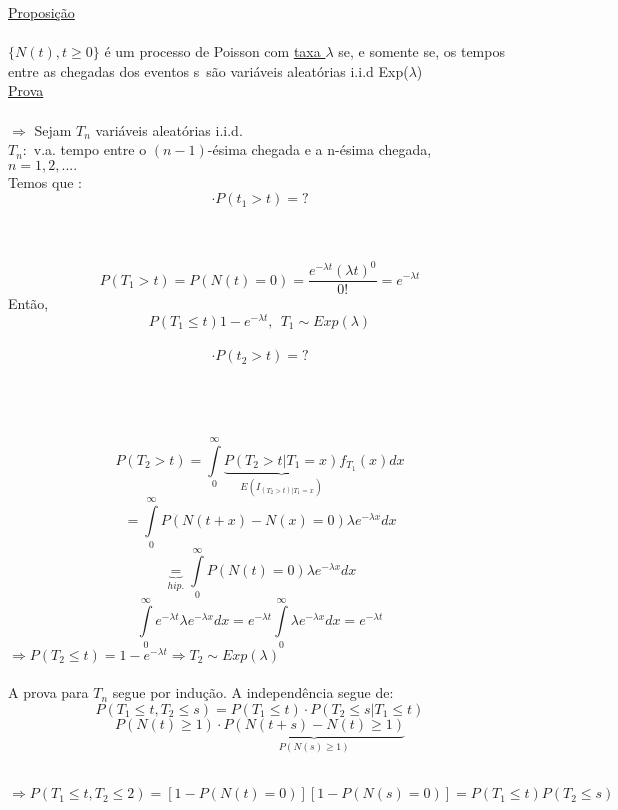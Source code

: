 \documentclass[a4paper,12pt]{article}
\begin{document}
 \underline{Proposição}\\
 \\
 $\{N(t),t\ge0\}$  é um processo de Poisson com \underline{taxa $\lambda$} se, e somente se, os tempos entre as chegadas dos eventos s são variáveis aleatórias i.i.d Exp($\lambda$)
 \\
 \underline{Prova}\\
 \\
 $\Rightarrow$ Sejam $T_n$ variáveis aleatórias i.i.d.\\
 $T_n:$ v.a. tempo entre o $(n-1)$-\'esima chegada e a n-\'esima chegada, \\$n=1,2,....$
 \\
 Temos que :
 $$\cdot P(t_1>t)=?$$
 \\
 \\
 $$P(T_1>t)=P(N(t)=0)=\frac{e^{-\lambda t}(\lambda t)^0}{0!}=e^{-\lambda t}
 $$
 Então,
 $$P(T_1\le t)1-e^{-\lambda t}, \ \ T_1\sim Exp(\lambda)$$
 \\
  $$\cdot P(t_2>t)=?$$
 
  \\
 \\
 \\
 
  $$P(T_2>t)=\int\limits_0^{\infty} \underbrace{P(T_2>t|T_1=x)}_
  {E(I_{(T_2>t)|T_1=x})}f_{T_1}(x)dx$$
 $$=\int\limits_0^{\infty}P(N(t+x)-N(x)=0)\lambda e^{-\lambda x}dx
 $$
 $$\underbrace{=}_{hip.}\int\limits_0^{\infty}P(N(t)=0)\lambda e^{-\lambda x}dx
 $$
 $$\int\limits_0^{\infty}e^{-\lambda t}\lambda e^{-\lambda x}dx=e^{-\lambda t}\int\limits_0^{\infty}\lambda e^{-\lambda x}dx=e^{-\lambda t}
 $$
 $\Rightarrow P(T_2\le t)=1-e^{-\lambda t}\Rightarrow T_2\sim Exp(\lambda)$\\
 \\
 A prova para $T_n$ segue por indução. A independência segue de:
 $$P(T_1\le t, T_2 \le s)=P(T_1\le t)\cdot P(T_2\le s|T_1\le t)
 $$
 $$P(N(t)\ge 1)\cdot \underbrace{P(N(t+s)-N(t)\ge 1)}_{P(N(s)\ge 1)}
 $$
   \\
 $$\Rightarrow P(T_1\le t,T_2\le 2)=[1-P(N(t)=0)][1-P(N(s)=0)]=P(T_1\le t)P(T_2\le s)
 $$
 
\end{document}
